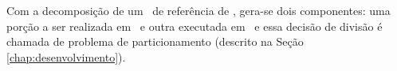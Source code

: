 	Com a decomposição de um \design\ de referência de \software, gera-se dois componentes: uma porção a ser realizada em \hardware\ e outra executada em \software\ e essa decisão de divisão é chamada de problema de particionamento (descrito na Seção \ref{chap:desenvolvimento}).


